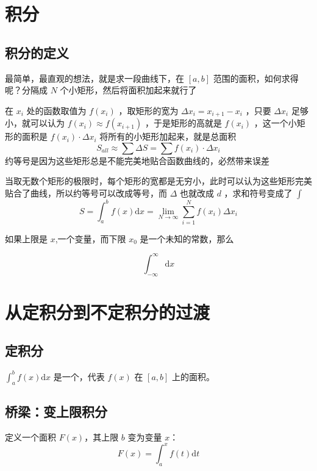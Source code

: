 \documentclass[lang=cn,newtx,10pt,scheme=chinese]{elegantbook}
\renewcommand{\textbf}[1]{\text{\heiti #1}}
\begin{document}
	\section{积分}
    \subsection{积分的定义}
    最简单，最直观的想法，就是求一段曲线下，在 $[a,b]$ 范围的面积，如何求得呢？分隔成 $N$ 个小矩形，然后将面积加起来就行了

    在 $x_i$ 处的函数取值为 $f(x_i)$ ，取矩形的宽为 $\Delta x_i=x_{i+1}-x_i$ ，只要 $\Delta x_i$ 足够小，就可以认为 $f(x_i)\approx f(x_{i+1})$ ，于是矩形的高就是 $f(x_i)$ ，这一个小矩形的面积是 $f(x_{i})\cdot \Delta x_{i}$ 
    将所有的小矩形加起来，就是总面积
    \begin{equation}
      S_{all}\approx \sum \Delta S =\sum f(x_{i})\cdot \Delta x_{i}
    \end{equation}
    约等号是因为这些矩形总是不能完美地贴合函数曲线的，必然带来误差

    当取无数个矩形的极限时，每个矩形的宽都是无穷小，此时可以认为这些矩形完美贴合了曲线，所以约等号可以改成等号，而 $\Delta$ 也就改成 $d$ ，求和符号变成了 $\int$
    \begin{equation}
      S=\int_{a}^{b} f(x) \mathrm{d}x=\lim_{N \to \infty} \sum_{i=1}^{N} f(x_i) \Delta x_{i}
    \end{equation}

    如果上限是 $x$,一个变量，而下限 $x_0$ 是一个未知的常数，那么

    \begin{equation}
      \int_{-\infty}^{\infty}  \mathrm{d}x
    \end{equation}
    \section*{从定积分到不定积分的过渡}

\subsection*{定积分}
$\int_{a}^{b} f(x) \mathrm{d}x$ 是一个\textbf{数值}，代表 $f(x)$ 在 $[a,b]$ 上的面积。

\subsection*{桥梁：变上限积分}
定义一个面积\textbf{函数} $F(x)$，其上限 $b$ 变为变量 $x$：
\begin{equation}
    F(x) = \int_{a}^{x} f(t) \mathrm{d}t
\end{equation}
\end{document}
